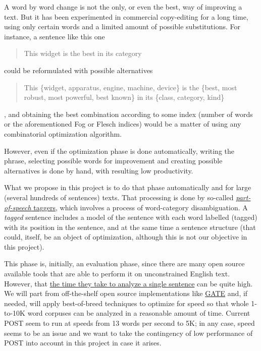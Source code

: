 \documentclass[a4paper,12pt,twocolumn]{article}
\begin{document}
A word by word change is not the only, or even the best, way of
improving a text. But it has been experimented in commercial
copy-editing for a long time, using only certain words and a limited
amount of possible substitutions. For instance, a sentence like this
one
\begin{quote}
This widget is the best in its category
\end{quote}
could be reformulated with possible alternatives
\begin{quote}
This \{widget, apparatus, engine, machine, device\} is the \{best, most
  robust, most powerful, best known\} in its \{class, category, kind\}
\end{quote}
, and obtaining the best combination according to some index (number
of words or the aforementioned Fog or Flesch indices) would be a
matter of using any combinatorial optimization algorithm.

However, even if the optimization phase is done automatically, writing
the phrase, selecting possible words for improvement and creating
possible alternatives is done by hand, with resulting low
productivity. 

What we propose in this project is to do that phase automatically and
for large (several hundreds of sentences) texts. That processing is
done by so-called \href{http://en.wikipedia.org/wiki/Part-of-speech_tagging}{{\em part-of-speech} taggers}, which involves a
process of word-category disambiguation. A {\em tagged} sentence
includes a model of the sentence with each word labelled (tagged) with
its position in the sentence, and at the same time a sentence
structure (that could, itself, be an object of optimization, although
this is not our objective in this project).

This phase is, initially, an evaluation phase, since there are many
open source available tools that are able to perform it on
unconstrained English text. However, that \href{http://mattwilkens.com/2008/11/08/evaluating-pos-taggers-speed/}{the time they take to analyze a single sentence} can be quite
high. We will part from off-the-shelf open source implementations like
\href{http://gate.ac.uk/wiki/twitter-postagger.html}{GATE} and, if needed, will
apply best-of-breed techniques to optimize for speed so that whole
1-to-10K word corpuses can be analyzed in a reasonable amount of
time. Current POST seem to run at speeds from 13 words per second to
5K; in any case, speed seems to be an issue and we want to take the
contingency of low performance of POST into account in this project in
case it arises. 
\end{document}
